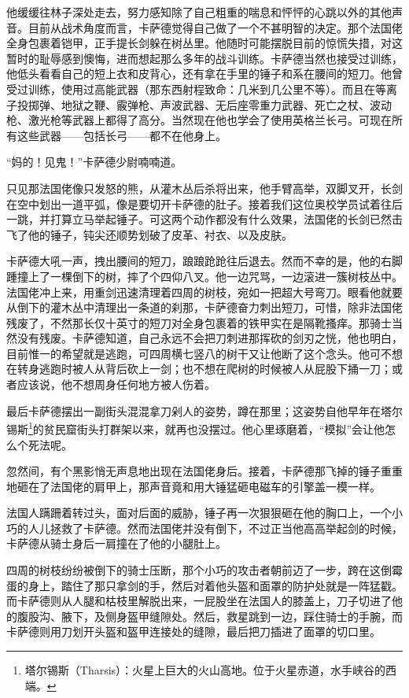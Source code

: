 \documentclass[AutoFakeBold=true]{book}
\begin{document}
他缓缓往林子深处走去，努力感知除了自己粗重的喘息和怦怦的心跳以外的其他声音。目前从战术角度而言，卡萨德觉得自己做了一个不甚明智的决定。那个法国佬全身包裹着铠甲，正手提长剑躲在树丛里。他随时可能摆脱目前的惊慌失措，对这暂时的耻辱感到懊悔，进而想起那么多年的战斗训练。卡萨德当然也接受过训练，他低头看看自己的短上衣和皮背心，还有拿在手里的锤子和系在腰间的短刀。他曾受过训练，使用过高能武器（那东西射程致命：几米到几公里不等）。而且在等离子投掷弹、地狱之鞭、霰弹枪、声波武器、无后座零重力武器、死亡之杖、波动枪、激光枪等武器上都得了高分。当然现在他也学会了使用英格兰长弓。可现在所有这些武器——包括长弓——都不在他身上。

``妈的！见鬼！''卡萨德少尉喃喃道。

只见那法国佬像只发怒的熊，从灌木丛后杀将出来，他手臂高举，双脚叉开，长剑在空中划出一道平弧，像是要切开卡萨德的肚子。接着我们这位奥校学员试着往后一跳，并打算立马举起锤子。可这两个动作都没有什么效果，法国佬的长剑已然击飞了他的锤子，钝尖还顺势划破了皮革、衬衣、以及皮肤。

卡萨德大吼一声，拽出腰间的短刀，踉踉跄跄往后退去。然而不幸的是，他的右脚踵撞上了一棵倒下的树，摔了个四仰八叉。他一边咒骂，一边滚进一簇树枝丛中。法国佬冲上来，用重剑迅速清理着四周的树枝，宛如一把超大号弯刀。眼看他就要从倒下的灌木丛中清理出一条道的刹那，卡萨德奋力刺出短刀，可惜，除非法国佬残废了，不然那长仅十英寸的短刀对全身包裹着的铁甲实在是隔靴搔痒。那骑士当然没有残废。卡萨德知道，自己永远不会把刀刺进那挥砍的剑刃之恍，他也明白，目前惟一的希望就是逃跑，可四周横七竖八的树干又让他断了这个念头。他可不想在转身逃跑时被人从背后砍上一剑；也不想在爬树的时候被人从屁股下捅一刀；或者应该说，他不想周身任何地方被人伤着。

最后卡萨德摆出一副街头混混拿刀剁人的姿势，蹲在那里；这姿势自他早年在塔尔锡斯\footnote{塔尔锡斯（Tharsis）：火星上巨大的火山高地。位于火星赤道，水手峡谷的西端。}的贫民窟街头打群架以来，就再也没摆过。他心里琢磨着，``模拟''会让他怎么个死法呢。

忽然间，有个黑影悄无声息地出现在法国佬身后。接着，卡萨德那飞掉的锤子重重地砸在了法国佬的肩甲上，那声音竟和用大锤猛砸电磁车的引擎盖一模一样。

法国人蹒跚着转过头，面对后面的威胁，锤子再一次狠狠砸在他的胸口上，一个小巧的人儿拯救了卡萨德。然而法国佬并没有倒下，不过正当他高高举起剑的时候，卡萨德从骑士身后一肩撞在了他的小腿肚上。

四周的树枝纷纷被倒下的骑士压断，那个小巧的攻击者朝前迈了一步，跨在这倒霉蛋的身上，踏住了那只拿剑的手，然后对着他头盔和面罩的防护处就是一阵猛戳。而卡萨德则从人腿和枯枝里解脱出来，一屁股坐在法国人的膝盖上，刀子切进了他的腹股沟、腋下，及侧身盔甲缝隙处。然后，救星跳到一边，踩住骑士的手腕，而卡萨德则用刀划开头盔和盔甲连接处的缝隙，最后把刀插进了面罩的切口里。
\end{document}
